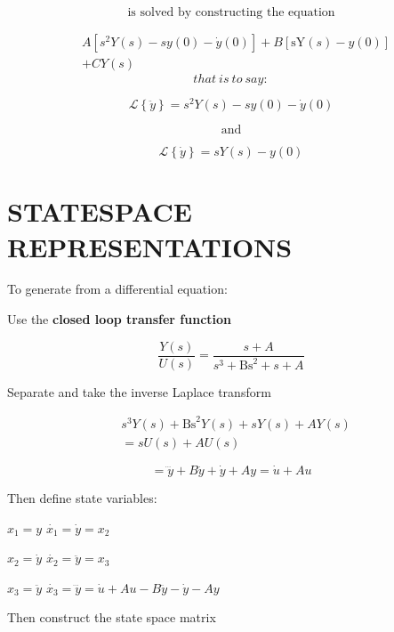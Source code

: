 \begin{multicols}{3}
\[\text{is solved by constructing the equation}\]


\begin{align*}
 &A\left\lbrack s^{2}Y\left( s \right) - sy\left( 0 \right) - \dot{y}\left( 0 \right) \right\rbrack + B\left\lbrack \text{sY}\left( s \right) - y\left( 0 \right) \right\rbrack \\
 & + CY(s)
\end{align*}
\[that\ is\ to\ say:\]

\[\mathcal{L}\left\{ \ddot{y} \right\} = s^{2}Y\left( s \right) - sy\left( 0 \right) - \dot{y}(0)\]

\[\text{and}\]

\[\mathcal{L}\left\{ \dot{y} \right\} = sY\left( s \right) - y\left( 0 \right)\]

\section{STATESPACE REPRESENTATIONS}

To generate from a differential equation:

Use the \textbf{closed loop transfer function}

\[\frac{Y\left( s \right)}{U\left( s \right)} = \frac{s + A}{s^{3} + \text{Bs}^{2} + s + A}\]

Separate and take the inverse Laplace transform

\begin{align*} &s^{3}Y\left( s \right) + \text{Bs}^{2}Y\left( s \right) + sY\left( s \right) + AY\left( s \right) \\
 &= sU\left( s \right) + AU\left( s \right)
 \end{align*}

\[= \dddot{y} + B\ddot{y} + \dot{y} + Ay = \dot{u} + Au\]

Then define state variables:

\(x_{1} = y\) \(\dot{x_{1}} = \dot{y} = x_{2}\)

\(x_{2} = \dot{y}\) \(\dot{x_{2}} = \ddot{y} = x_{3}\)

\(x_{3} = \ddot{y}\)
\(\dot{x_{3}} = \dddot{y} = \dot{u} + Au - B\ddot{y} - \dot{y} - Ay\)

Then construct the state space matrix


\end{multicols}
